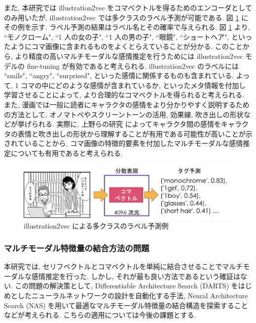 また, 本研究では illustration2vec をコマベクトルを得るためのエンコーダとしてのみ用いたが, illustration2vec では多クラスのラベル予測が可能である. 図 \ref{fig:i2v_tag} にその例を示す. ラベル予測の結果はラベル名とその確率で与えられる. 図 \ref{fig:i2v_tag} より, ``モノクローム", ``1 人の女の子", ``1 人の男の子", ``眼鏡", ``ショートヘア", といったようにコマ画像に含まれるものをよくとらえていることが分かる. このことから, より精度の高いマルチモーダルな感情推定を行うためには illustration2vec モデルの fine-tuning が有効であると考えられる. illustration2vec のラベルには ``smile", ``angry", ``surprised", といった感情に関係するものも含まれている. よって, 1 コマの中にどのような感情が含まれているか, といったメタ情報を付加し学習させることによって, より合理的なコマベクトルを得られると考えられる. また, 漫画では一般に読者にキャラクタの感情をより分かりやすく説明するための方法として, オノマトペやスクリーントーンの活用, 効果線, 吹き出しの形状などが挙げられる. 実際に, 上野らの研究 \cite{ueno-emotion2016} によってキャラクタ間の感情をキャラクタの表情と吹き出しの形状から理解することが有用である可能性が高いことが示されていることから, コマ画像の特徴的要素を付加したマルチモーダルな感情推定についても有用であると考えられる.

\begin{figure}[!h]
  \vspace{10mm}
  \centering
  \includegraphics[width=0.9\hsize]{doc/figures/illustration2vec_tag.png}
  \caption{illustration2vec による多クラスのラベル予測例}
  \label{fig:i2v_tag}
\end{figure}

\newpage

\changeindent{0cm}
\subsubsection{マルチモーダル特徴量の結合方法の問題}
\changeindent{2cm}

本研究では, セリフベクトルとコマベクトルを単純に結合させることでマルチモーダルな感情推定を行った. しかし, それが最も良い方法であるという確証はない. この問題の解決策として, Differentiable Architecture Search (DARTS) \cite{DBLP:journals/corr/abs-1806-09055} をはじめとしたニューラルネットワークの設計を自動化する手法, Neural Architecture Search (NAS) を用いて最適なマルチモーダル特徴量の結合構造を探索することなどが考えられる. こちらの適用については今後の課題とする.

